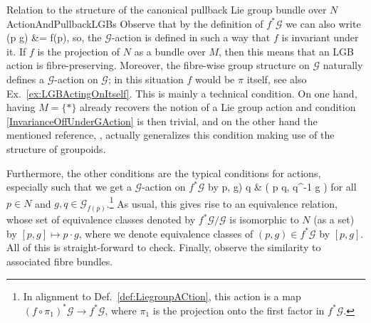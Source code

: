 \documentclass[a4paper,oneside,11pt,bibliography=totoc]{scrartcl}
\def\ba#1\ea{\begin{align}#1\end{align}}
\def\bas#1\eas{\begin{align*}#1\end{align*}}
\theoremstyle{plain}
\theoremstyle{remark}
\theoremstyle{definition}
\begin{document}
\begin{remarks}{Relation to the structure of the canonical pullback Lie group bundle over $N$}{ActionAndPullbackLGBs}
Observe that by the definition of $f^*\mathcal{G}$ we can also write
\bas
f(p \cdot g) &= f(p),
\eas
so, the $\mathcal{G}$-action is defined in such a way that $f$ is invariant under it. If $f$ is the projection of $N$ as a bundle over $M$, then this means that an LGB action is fibre-preserving. Moreover, the fibre-wise group structure on $\mathcal{G}$ naturally defines a $\mathcal{G}$-action on $\mathcal{G}$; in this situation $f$ would be $\pi$ itself, see also Ex.\ \ref{ex:LGBActingOnItself}. This is mainly a technical condition. On one hand, having $M = \{*\}$ already recovers the notion of a Lie group action and condition \eqref{InvarianceOffUnderGAction} is then trivial, and on the other hand the mentioned reference, \cite[\S 1.6, Def.\ 1.6.1, page 34]{mackenzieGeneralTheory}, actually generalizes this condition making use of the structure of groupoids.
\newline

Furthermore, the other conditions are the typical conditions for actions, especially such that we get a $\mathcal{G}$-action on $f^*\mathcal{G}$ by
\ba
(p, g) \cdot q
&\coloneqq
\mleft( p \cdot q, q^{-1} g \mright)
\ea
for all $p \in N$ and $g, q \in \mathcal{G}_{f(p)}$.\footnote{In alignment to Def.\ \ref{def:LiegroupACtion}, this action is a map $(f \circ \pi_1)^*\mathcal{G} \to f^*\mathcal{G}$, where $\pi_1$ is the projection onto the first factor in $f^*\mathcal{G}$.}
As usual, this gives rise to an equivalence relation, whose set of equivalence classes denoted by $f^*\mathcal{G} \Big/ \mathcal{G}$ is isomorphic to $N$ (as a set) by $[p, g] \mapsto p \cdot g$, where we denote equivalence classes of $(p, g) \in f^*\mathcal{G}$ by $[p, g]$. All of this is straight-forward to check. Finally, observe the similarity to associated fibre bundles.
\end{remarks}
\end{document}
